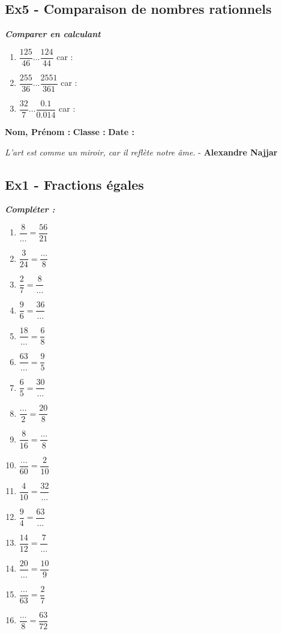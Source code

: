 \documentclass[11pt]{article}
\begin{document}
\subsection*{Ex5 - Comparaison de nombres rationnels}

\textit{\textbf{Comparer en calculant}}

\begin{enumerate}
\item $ \dfrac{125}{46} \ldots \dfrac{124}{44} $  car : \dotfill
\item $ \dfrac{255}{36} \ldots \dfrac{2551}{361} $  car : \dotfill
\item $ \dfrac{32}{7} \ldots \dfrac{0.1}{0.014} $  car : \dotfill
\end{enumerate}

\newpage

\textbf{Nom, Prénom :} \hspace{8cm} \textbf{Classe :} \hspace{3cm} \textbf{Date :}\\

\begin{center}
  \textit{L'art est comme un miroir, car il reflète notre âme.}  - \textbf{Alexandre Najjar}
\end{center}

\subsection*{Ex1 - Fractions égales}

\textit{\textbf{Compléter :}}

\begin{multicols}{4}

  \begin{enumerate}
    \item $\dfrac{8}{\ldots}=\dfrac{56}{21}$
    \item $\dfrac{3}{24}=\dfrac{\ldots}{8}$
    \item $\dfrac{2}{7}=\dfrac{8}{\ldots}$
    \item $\dfrac{9}{6}=\dfrac{36}{\ldots}$
    \item $\dfrac{18}{\ldots}=\dfrac{6}{8}$
    \item $\dfrac{63}{\ldots}=\dfrac{9}{5}$
    \item $\dfrac{6}{5}=\dfrac{30}{\ldots}$
    \item $\dfrac{\ldots}{2}=\dfrac{20}{8}$
    \item $\dfrac{8}{16}=\dfrac{\ldots}{8}$
    \item $\dfrac{\ldots}{60}=\dfrac{2}{10}$
    \item $\dfrac{4}{10}=\dfrac{32}{\ldots}$
    \item $\dfrac{9}{4}=\dfrac{63}{\ldots}$
    \item $\dfrac{14}{12}=\dfrac{7}{\ldots}$
    \item $\dfrac{20}{\ldots}=\dfrac{10}{9}$
    \item $\dfrac{\ldots}{63}=\dfrac{2}{7}$
    \item $\dfrac{\ldots}{8}=\dfrac{63}{72}$
  \end{enumerate}

\end{multicols}
\end{document}
